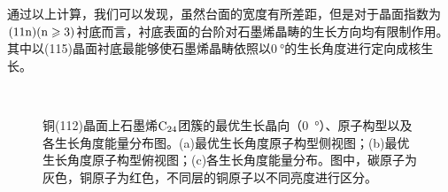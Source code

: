 通过以上计算，我们可以发现，虽然台面的宽度有所差距，但是对于晶面指数为$\rm{(11n)(n \geqslant 3)}$衬底而言，衬底表面的台阶对石墨烯晶畴的生长方向均有限制作用。其中以(115)晶面衬底最能够使石墨烯晶畴依照以$\SI{0 }{\degree}$的生长角度进行定向成核生长。

\begin{figure}[!htb]
    \\[-0.5ex]
    \caption{铜(112)晶面上石墨烯$\rm{C_{24}}$团簇的最优生长晶向（\SI{0}  {\degree}）、原子构型以及各生长角度能量分布图。(a)最优生长角度原子构型侧视图；(b)最优生长角度原子构型俯视图；(c)各生长角度能量分布。图中，碳原子为灰色，铜原子为红色，不同层的铜原子以不同亮度进行区分。}
    \label{fig:GO_C24_112}
\end{figure}

